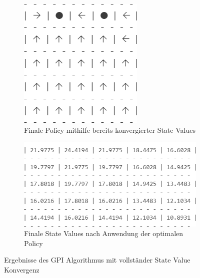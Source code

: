 \documentclass[11pt]{article}
\begin{document}
\begin{figure}
    \centering
    \begin{subfigure}[t]{0.32\textwidth}
        \centering
        \includegraphics[width=\textwidth]{img/3_1_a1.png}
        \caption{Finale Policy mithilfe bereits konvergierter State Values}
        \label{img:3_1_a1}
    \end{subfigure}
    \hfill
    \begin{subfigure}[t]{0.65\textwidth}
        \includegraphics[width=\textwidth]{img/3_1_a2.png}
        \caption{Finale State Values nach Anwendung der optimalen Policy}
        \label{img:3_1_a2}
    \end{subfigure}
    \caption{Ergebnisse des GPI Algorithmus mit vollständer State Value Konvergenz}
    \label{img:3_1_a}
\end{figure}
\end{document}
